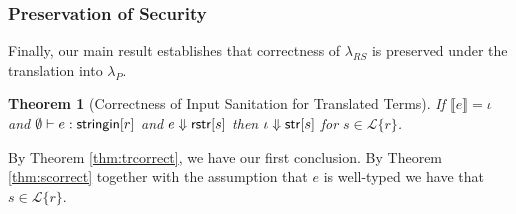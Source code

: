 \documentclass[10pt]{sigplanconf}
\newtheorem{thm}{Theorem}
\theoremstyle{definition}
\newcommand{\Lagr}{\mathcal{L}}
\newcommand{\lang}[1]{\Lagr\{#1\}}
\newcommand{\lambdas}{\lambda_{RS}}
\newcommand{\lambdap}{\lambda_P}
\newcommand{\stringin}[1]{{\sf stringin}[#1]}
\renewcommand{\tstr}[1]{{{\sf str}[#1]}}
\newcommand{\trden}[1]{\llbracket #1 \rrbracket} %
\newcommand{\sreduces}{ \Downarrow }
\begin{document}
\subsubsection{Preservation of Security}

Finally, our main result establishes that correctness of $\lambdas$ is preserved under the translation into $\lambdap$. \renewcommand*{\proofname}{Proof}

\begin{thm}[Correctness of Input Sanitation for Translated Terms]\label{thm:main}
  If $\trden{e} = \iota$ and $\emptyset \vdash e : \stringin{r}$ and $e \sreduces \rstr{s}$ then $\iota \sreduces \tstr{s}$
  for $s \in \lang{r}$.
\end{thm}
\begin{prf}
  By Theorem \ref{thm:trcorrect}, we have our first conclusion. By Theorem \ref{thm:scorrect} together with the assumption that $e$ is well-typed we have that $s \in \lang{r}$.
\end{prf}

%
%

\end{document}
